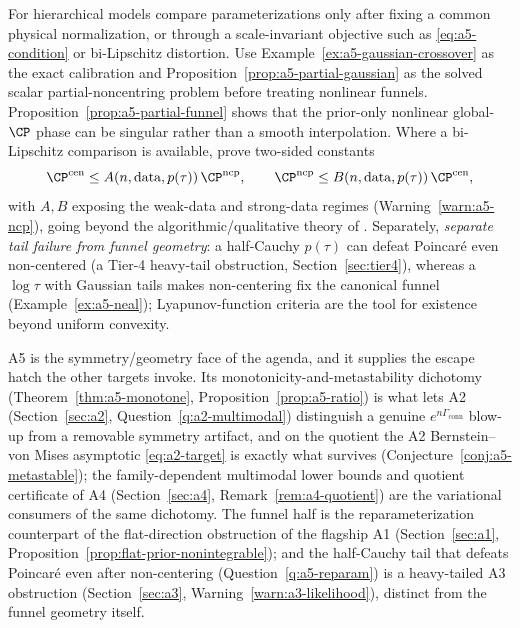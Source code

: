 \documentclass[../../main.tex]{subfiles}
\begin{document}
\begin{question}
\label{q:a5-reparam}
For hierarchical models compare parameterizations only after fixing a common physical
normalization, or through a scale-invariant objective such as \eqref{eq:a5-condition} or
bi-Lipschitz distortion. Use Example~\ref{ex:a5-gaussian-crossover} as the exact calibration and
Proposition~\ref{prop:a5-partial-gaussian} as the solved scalar partial-noncentring problem before
treating nonlinear funnels. Proposition~\ref{prop:a5-partial-funnel} shows that the prior-only
nonlinear global-$\CP$ phase can be singular rather than a smooth interpolation.
Where a bi-Lipschitz comparison is available, prove two-sided constants
\[
  \CP^{\mathrm{cen}}\le A(n,\text{data},p(\tau))\,\CP^{\mathrm{ncp}},
  \qquad
  \CP^{\mathrm{ncp}}\le B(n,\text{data},p(\tau))\,\CP^{\mathrm{cen}},
\]
with $A,B$ exposing the weak-data and strong-data regimes (Warning~\ref{warn:a5-ncp}), going
beyond the algorithmic/qualitative theory of \cite{PapaspiliopoulosRobertsSkold2007,YuMeng2011}.
Separately, \emph{separate tail failure from funnel geometry}: a half-Cauchy $p(\tau)$ can
defeat Poincar\'e even non-centered (a Tier-4 heavy-tail obstruction, Section~\ref{sec:tier4}),
whereas a $\log\tau$ with Gaussian tails makes non-centering fix the canonical funnel
(Example~\ref{ex:a5-neal}); Lyapunov-function criteria
\cite{BakryCattiauxGuillin2008,CattiauxGuillinWangWu2009} are the tool for existence beyond
uniform convexity.
\end{question}

\begin{remark}
\label{rem:a5-relations}
A5 is the symmetry/geometry face of the agenda, and it supplies the escape hatch the other targets
invoke. Its monotonicity-and-metastability dichotomy (Theorem~\ref{thm:a5-monotone},
Proposition~\ref{prop:a5-ratio}) is what lets A2 (Section~\ref{sec:a2},
Question~\ref{q:a2-multimodal}) distinguish a genuine $e^{n\Gamma_{\mathrm{conn}}}$ blow-up from a removable
symmetry artifact, and on the quotient the A2 Bernstein--von Mises asymptotic \eqref{eq:a2-target}
is exactly what survives (Conjecture~\ref{conj:a5-metastable}); the family-dependent multimodal
lower bounds and quotient certificate of A4 (Section~\ref{sec:a4}, Remark~\ref{rem:a4-quotient})
are the variational consumers of the same dichotomy. The funnel half is the reparameterization
counterpart of the flat-direction obstruction of the flagship A1 (Section~\ref{sec:a1},
Proposition~\ref{prop:flat-prior-nonintegrable}); and the half-Cauchy tail that defeats Poincar\'e
even after non-centering (Question~\ref{q:a5-reparam}) is a heavy-tailed A3 obstruction
(Section~\ref{sec:a3}, Warning~\ref{warn:a3-likelihood}), distinct from the funnel geometry itself.
\end{remark}
\end{document}
